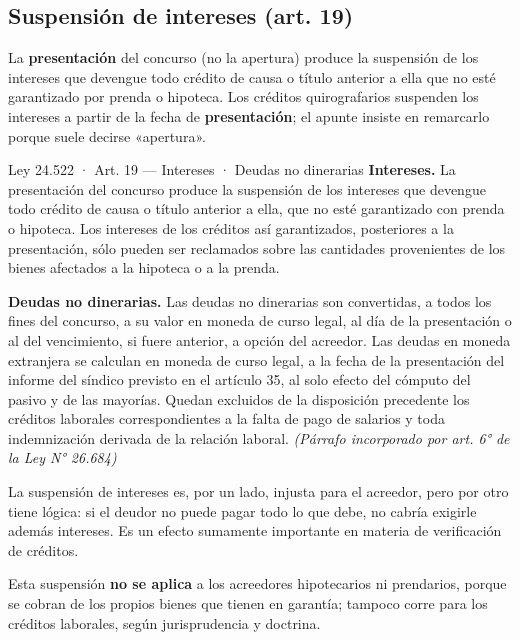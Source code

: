 \documentclass[12pt,oneside]{book}
\begin{document}
\subsection{Suspensión de intereses (art. 19)}

La \textbf{presentación} del concurso (no la apertura) produce la suspensión de los intereses que devengue todo crédito de causa o título anterior a ella que no esté garantizado por prenda o hipoteca. Los créditos quirografarios suspenden los intereses a partir de la fecha de \textbf{presentación}; el apunte insiste en remarcarlo porque suele decirse «apertura».

\begin{norma}{Ley 24.522 · Art. 19 — Intereses · Deudas no dinerarias}
\textbf{Intereses.} La presentación del concurso produce la suspensión de los intereses que devengue todo crédito de causa o título anterior a ella, que no esté garantizado con prenda o hipoteca. Los intereses de los créditos así garantizados, posteriores a la presentación, sólo pueden ser reclamados sobre las cantidades provenientes de los bienes afectados a la hipoteca o a la prenda.

\textbf{Deudas no dinerarias.} Las deudas no dinerarias son convertidas, a todos los fines del concurso, a su valor en moneda de curso legal, al día de la presentación o al del vencimiento, si fuere anterior, a opción del acreedor. Las deudas en moneda extranjera se calculan en moneda de curso legal, a la fecha de la presentación del informe del síndico previsto en el artículo 35, al solo efecto del cómputo del pasivo y de las mayorías. Quedan excluidos de la disposición precedente los créditos laborales correspondientes a la falta de pago de salarios y toda indemnización derivada de la relación laboral. \textit{(Párrafo incorporado por art. 6° de la Ley N° 26.684)}
\end{norma}

La suspensión de intereses es, por un lado, injusta para el acreedor, pero por otro tiene lógica: si el deudor no puede pagar todo lo que debe, no cabría exigirle además intereses. Es un efecto sumamente importante en materia de verificación de créditos.

Esta suspensión \textbf{no se aplica} a los acreedores hipotecarios ni prendarios, porque se cobran de los propios bienes que tienen en garantía; tampoco corre para los créditos laborales, según jurisprudencia y doctrina.
\end{document}
